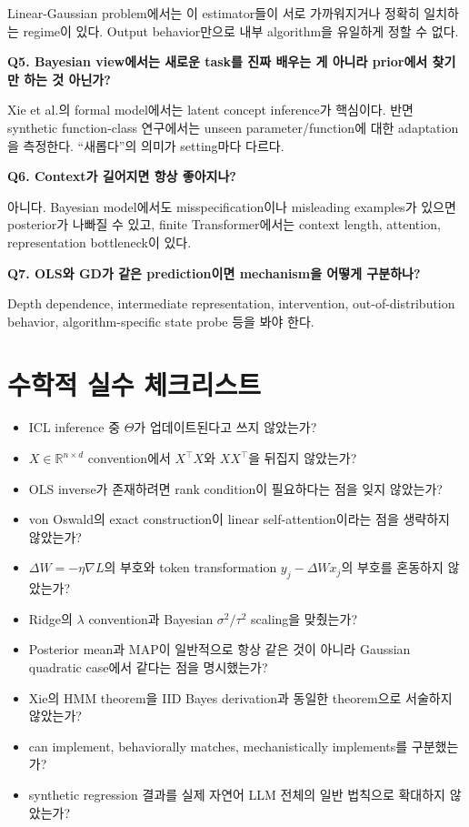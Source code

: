 \documentclass[11pt,a4paper,oneside,openany]{memoir}
\newcommand{\R}{\mathbb{R}}
\theoremstyle{definition}
\begin{document}
Linear-Gaussian problem에서는 이 estimator들이 서로 가까워지거나 정확히 일치하는 regime이 있다. Output behavior만으로 내부 algorithm을 유일하게 정할 수 없다.

\textbf{Q5. Bayesian view에서는 새로운 task를 진짜 배우는 게 아니라 prior에서 찾기만 하는 것 아닌가?}

Xie et al.의 formal model에서는 latent concept inference가 핵심이다. 반면 synthetic function-class 연구에서는 unseen parameter/function에 대한 adaptation을 측정한다. ``새롭다''의 의미가 setting마다 다르다.

\textbf{Q6. Context가 길어지면 항상 좋아지나?}

아니다. Bayesian model에서도 misspecification이나 misleading examples가 있으면 posterior가 나빠질 수 있고, finite Transformer에서는 context length, attention, representation bottleneck이 있다.

\textbf{Q7. OLS와 GD가 같은 prediction이면 mechanism을 어떻게 구분하나?}

Depth dependence, intermediate representation, intervention, out-of-distribution behavior, algorithm-specific state probe 등을 봐야 한다.

\section{수학적 실수 체크리스트}

\begin{itemize}
\item ICL inference 중 $\Theta$가 업데이트된다고 쓰지 않았는가?
\item $X\in\R^{n\times d}$ convention에서 $X^\top X$와 $XX^\top$을 뒤집지 않았는가?
\item OLS inverse가 존재하려면 rank condition이 필요하다는 점을 잊지 않았는가?
\item von Oswald의 exact construction이 linear self-attention이라는 점을 생략하지 않았는가?
\item $\Delta W=-\eta\nabla L$의 부호와 token transformation $y_j-\Delta Wx_j$의 부호를 혼동하지 않았는가?
\item Ridge의 $\lambda$ convention과 Bayesian $\sigma^2/\tau^2$ scaling을 맞췄는가?
\item Posterior mean과 MAP이 일반적으로 항상 같은 것이 아니라 Gaussian quadratic case에서 같다는 점을 명시했는가?
\item Xie의 HMM theorem을 IID Bayes derivation과 동일한 theorem으로 서술하지 않았는가?
\item can implement, behaviorally matches, mechanistically implements를 구분했는가?
\item synthetic regression 결과를 실제 자연어 LLM 전체의 일반 법칙으로 확대하지 않았는가?
\end{itemize}
\end{document}
